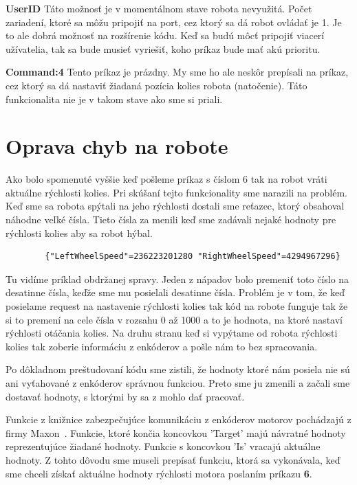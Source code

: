 \noindent \textbf{UserID} \newline
\indent Táto možnosť je v momentálnom stave robota nevyužitá. Počet zariadení, ktoré sa môžu pripojiť na port, cez ktorý sa dá robot ovládať je 1. Je to ale
dobrá možnosť na rozšírenie kódu. Keď sa budú môcť pripojiť viacerí užívatelia, tak sa bude musieť vyriešiť, koho príkaz bude mať akú prioritu. \newline

\noindent \textbf{Command:4} \newline
\indent Tento príkaz je prázdny. My sme ho ale neskôr prepísali na príkaz, cez ktorý sa dá nastaviť žiadaná pozícia kolies robota (natočenie). Táto funkcionalita nie je
v takom stave ako sme si priali.

\section{Oprava chyb na robote}
\indent Ako bolo spomenuté vyššie keď pošleme príkaz s číslom 6 tak na robot vráti aktuálne rýchlosti kolies. Pri skúšaní tejto funkcionality sme narazili na problém.
Keď sme sa robota spýtali na jeho rýchlosti dostali sme reťazec, ktorý obsahoval náhodne veľké čísla. Tieto čísla za menili keď sme zadávali nejaké hodnoty pre rýchlosti kolies
aby sa robot hýbal.

\label{jsonWannabeSpeed}
\begin{lstlisting}
		{"LeftWheelSpeed"=236223201280 "RightWheelSpeed"=4294967296}
\end{lstlisting}

Tu vidíme príklad obdržanej spravy. Jeden z nápadov bolo premeniť toto číslo na desatinne čísla, keďže sme mu posielali desatinne čísla. Problém je v tom, že keď 
posielame request na nastavenie rýchlosti kolies tak kód na robote funguje tak že si to premení na cele čísla v rozsahu 0 až 1000 a to je hodnota, na ktoré nastaví rýchlosti
otáčania kolies. Na druhu stranu keď si vypýtame od robota rýchlosti kolies tak zoberie informáciu z enkóderov a pošle nám to bez spracovania.

Po dôkladnom preštudovaní kódu sme zistili, že hodnoty ktoré nám posiela nie sú ani vyťahované z enkóderov správnou funkciou. Preto sme ju zmenili a začali sme dostavať hodnoty,
s ktorými by sa z mohlo dať pracovať.

Funkcie z knižnice zabezpečujúce komunikáciu z enkóderov motorov pochádzajú z firmy Maxon~\cite{EPOSdoc}. Funkcie, ktoré končia koncovkou 'Target' majú
návratné hodnoty reprezentujúce žiadané hodnoty. Funkcie s koncovkou 'Is' vracajú aktuálne hodnoty. Z tohto dôvodu sme museli prepísať funkciu, ktorá sa vykonávala,
keď sme chceli získať aktuálne hodnoty rýchlosti motora poslaním príkazu \textbf{6}.

